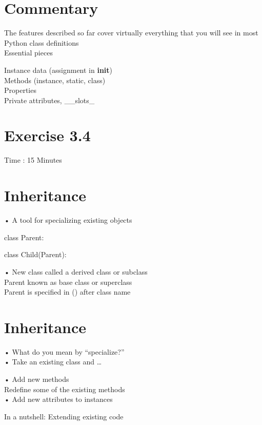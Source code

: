 \documentclass[
  letterpaper,
  DIV=11,
  numbers=noendperiod]{scrreprt}
\begin{document}
\chapter{Commentary}\label{commentary-1}

The features described so far cover virtually everything that you will
see in most Python class definitions\\
Essential pieces

Instance data (assignment in \textbf{init})\\
Methods (instance, static, class)\\
Properties\\
Private attributes, \_\_slots\_


\chapter{Exercise 3.4}\label{exercise-3.4}

Time : 15 Minutes


\chapter{Inheritance}\label{inheritance}

• A tool for specializing existing objects

class Parent:

class Child(Parent):

• New class called a derived class or subclass\\
Parent known as base class or superclass\\
Parent is specified in () after class name


\chapter{Inheritance}\label{inheritance-1}

• What do you mean by ``specialize?''\\
• Take an existing class and \ldots{}

• Add new methods\\
Redefine some of the existing methods\\
• Add new attributes to instances

In a nutshell: Extending existing code
\end{document}
